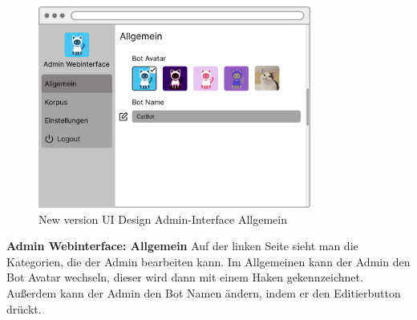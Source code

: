\begin{figure}[H]
    \centering
    \includegraphics[width=0.8\textwidth]{bilder/new vers. UI Design/Allgemein/Allgemein.png}
    \caption{New version UI Design Admin-Interface Allgemein}
    \label{fig:New version UI Design Admin-Interface Allgemein}
    \end{figure}
\noindent \textbf{Admin Webinterface: Allgemein} \newline
Auf der linken Seite sieht man die Kategorien, die der Admin bearbeiten kann. Im Allgemeinen kann
der Admin den Bot Avatar wechseln, dieser wird dann mit einem Haken gekennzeichnet. Außerdem kann
der Admin den Bot Namen ändern, indem er den Editierbutton drückt.

